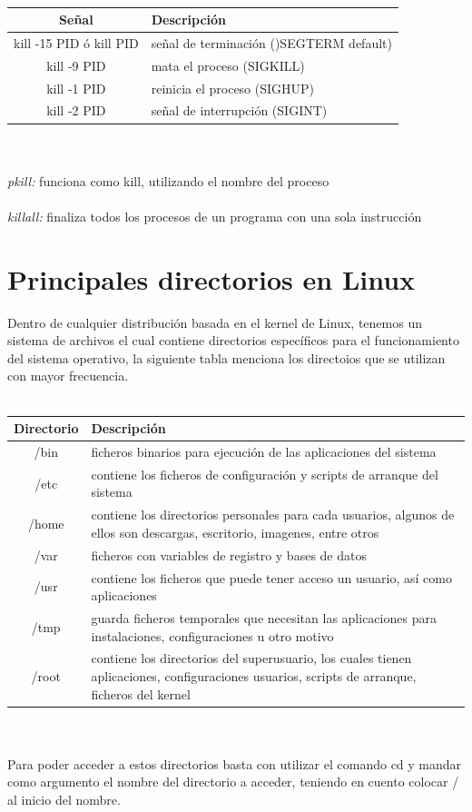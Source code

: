 \documentclass[10pt,a4paper,titlepage]{article}
\begin{document}
	\\
	\begin{tabular}{|c|p{8cm}|}
		\hline
		Señal & Descripción \\
		\hline
		kill -15 PID ó kill PID & señal de terminación ()SEGTERM default) \\
		\hline
		kill -9 PID & mata el proceso (SIGKILL) \\
		\hline
		kill -1 PID & reinicia el proceso (SIGHUP) \\
		\hline
		kill -2 PID & señal de interrupción (SIGINT) \\
		\hline
	\end{tabular}
	\\
	\\
	\emph{pkill:} funciona como kill, utilizando el nombre del proceso
	\\
	\\
	\emph{killall:} finaliza todos los procesos de un programa con una sola instrucción
	
	\section*{Principales directorios en Linux}
	Dentro de cualquier distribución basada en el kernel de Linux, tenemos un sistema de archivos el cual contiene directorios específicos para el funcionamiento del sistema operativo, la siguiente tabla menciona los directoios que se utilizan con mayor frecuencia.
	\\
	\\
	\begin{tabular}{|c|p{9cm}|}
		\hline
		Directorio & Descripción \\
		\hline
		/bin & ficheros binarios para ejecución de las aplicaciones del sistema \\
		\hline
		/etc & contiene los ficheros de configuración y scripts de arranque del sistema \\
		\hline
		/home & contiene los directorios personales para cada usuarios, algunos de ellos son descargas, escritorio, imagenes, entre otros \\
		\hline
		/var & ficheros con variables de registro y bases de datos \\
		\hline
		/usr & contiene los ficheros que puede tener acceso un usuario, así como aplicaciones \\
		\hline
		/tmp & guarda ficheros temporales que necesitan las aplicaciones para instalaciones, configuraciones u otro motivo \\
		\hline
		/root & contiene los directorios del superusuario, los cuales tienen aplicaciones, configuraciones usuarios, scripts de arranque, ficheros del kernel \\
		\hline
	\end{tabular}
	\\
	\\
	Para poder acceder a estos directorios basta con utilizar el comando cd y mandar como argumento el nombre del directorio a acceder, teniendo en cuento colocar / al inicio del nombre.
	
\end{document}

